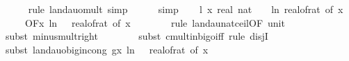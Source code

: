 \begin{isabellebody}
\ \ \ \ \isamarkupfalse%
\ {\isacharparenleft}{\kern0pt}rule\ landau{\isacharunderscore}{\kern0pt}o{\isachardot}{\kern0pt}mult{\isacharcomma}{\kern0pt}\ simp{\isacharparenright}{\kern0pt}\isanewline
\ \ \ \ \isamarkupfalse%
\ simp\isanewline
\isanewline
\ \ \isamarkupfalse%
\ l{}{\isacharcolon}{\kern0pt}\ {\isachardoublequoteopen}{\isacharparenleft}{\kern0pt}{\isasymlambda}x{\isachardot}{\kern0pt}\ real\ {\isacharparenleft}{\kern0pt}nat\ {\isasymlceil}{\isacharminus}{\kern0pt}\ {\isacharparenleft}{\kern0pt}{}{}\ {\isacharasterisk}{\kern0pt}\ ln\ {\isacharparenleft}{\kern0pt}real{\isacharunderscore}{\kern0pt}of{\isacharunderscore}{\kern0pt}rat\ {\isacharparenleft}{\kern0pt}{\isasymepsilon}{\isacharunderscore}{\kern0pt}of\ x{\isacharparenright}{\kern0pt}{\isacharparenright}{\kern0pt}{\isacharparenright}{\kern0pt}{\isasymrceil}{\isacharparenright}{\kern0pt}{\isacharparenright}{\kern0pt}\isanewline
\ \ \ \ {\isasymin}\ O{\isacharbrackleft}{\kern0pt}{\isacharquery}{\kern0pt}F{\isacharbrackright}{\kern0pt}{\isacharparenleft}{\kern0pt}{\isasymlambda}x{\isachardot}{\kern0pt}\ ln\ {\isacharparenleft}{\kern0pt}{}\ {\isacharslash}{\kern0pt}\ real{\isacharunderscore}{\kern0pt}of{\isacharunderscore}{\kern0pt}rat\ {\isacharparenleft}{\kern0pt}{\isasymepsilon}{\isacharunderscore}{\kern0pt}of\ x{\isacharparenright}{\kern0pt}{\isacharparenright}{\kern0pt}{\isacharparenright}{\kern0pt}{\isachardoublequoteclose}\ \isanewline
\ \ \ \ \ \isamarkupfalse%
\ {\isacharparenleft}{\kern0pt}rule\ landau{\isacharunderscore}{\kern0pt}nat{\isacharunderscore}{\kern0pt}ceil{\isacharbrackleft}{\kern0pt}OF\ unit{\isacharunderscore}{\kern0pt}{}{\isacharbrackright}{\kern0pt}{\isacharparenright}{\kern0pt}\isanewline
\ \ \ \ \isamarkupfalse%
\ {\isacharparenleft}{\kern0pt}subst\ minus{\isacharunderscore}{\kern0pt}mult{\isacharunderscore}{\kern0pt}right{\isacharparenright}{\kern0pt}\isanewline
\ \ \ \ \ \ \isamarkupfalse%
\ {\isacharparenleft}{\kern0pt}subst\ cmult{\isacharunderscore}{\kern0pt}in{\isacharunderscore}{\kern0pt}bigo{\isacharunderscore}{\kern0pt}iff{\isacharcomma}{\kern0pt}\ rule\ disjI{}{\isacharparenright}{\kern0pt}\isanewline
\ \ \ \ \ \ \isamarkupfalse%
\ {\isacharparenleft}{\kern0pt}subst\ landau{\isacharunderscore}{\kern0pt}o{\isachardot}{\kern0pt}big{\isachardot}{\kern0pt}in{\isacharunderscore}{\kern0pt}cong{\isacharbrackleft}{\kern0pt}\ g{\isacharequal}{\kern0pt}{\isachardoublequoteopen}{\isasymlambda}x{\isachardot}{\kern0pt}\ ln{\isacharparenleft}{\kern0pt}\ {}\ {\isacharslash}{\kern0pt}\ {\isacharparenleft}{\kern0pt}real{\isacharunderscore}{\kern0pt}of{\isacharunderscore}{\kern0pt}rat\ {\isacharparenleft}{\kern0pt}{\isasymepsilon}{\isacharunderscore}{\kern0pt}of\ x{\isacharparenright}{\kern0pt}{\isacharparenright}{\kern0pt}{\isacharparenright}{\kern0pt}{\isachardoublequoteclose}{\isacharbrackright}{\kern0pt}{\isacharparenright}{\kern0pt}\isanewline

\end{isabellebody}
